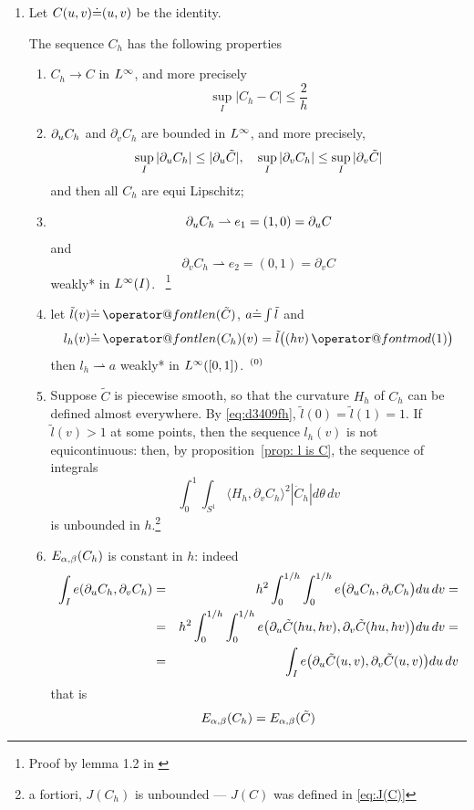 \documentclass[twoside,a4paper,english]{article}
\makeatletter
\def\derpar#1{\partial_{#1}}
\def\wto{\rightharpoonup}
\def\len{\mathop{\operator@font len}\nolimits}
\def\mod{\mathop{\operator@font mod}\nolimits}
\renewcommand{\thefootnote}{\,(\arabic{footnote})}
\makeatother
\begin{document}
\begin{enumerate}
\item 
 Let $C(u,v){\stackrel{\mbox{.}}{=}} (u,v)$ be the identity.

 The sequence $C_h$ has the following properties
 \begin{enumerate}
 \item $C_h\to C$ in $L^\infty$, and more precisely
   \[ \sup_{I} |C_h-C| \le \frac 2 h \]

 \item $\derpar \t C_h$ and $\derpar v C_h $
   are bounded in $L^\infty$, and more precisely,
   \[ \sup_I |\derpar \t C_h| \le  |\derpar \t \tilde C|,~~~
   \sup_I |\derpar v C_h|\le  \sup_I |\derpar v \tilde C| \] 
   and then all $C_h$ are equi Lipschitz;


 \item \[ \derpar \t C_h \wto e_1=(1,0)=\derpar \t C \] 
   and \[ \derpar v C_h \wto e_2=(0,1)=\derpar v  C \]
   weakly* in $L^\infty(I)$.~%
\footnote{Proof by lemma 1.2 in \cite{dacorogna:weak}}
   
 \item let $\tilde l(v)\defeq \len(\tilde C)$, $ a{\stackrel{\mbox{.}}{=}} \int \tilde l$ and
   \[ l_h(v) \defeq \len(C_h)(v) = \tilde l\big( (hv)\mod(1)\big)\]
   then $l_h\wto a$   weakly* in $L^\infty([0,1])$.$~^{\thefootnote}$

 \item\label{item: J esplode}
   Suppose $\tilde C$ is piecewise smooth, so that the curvature
   $H_h$ of $C_h$ can be defined almost everywhere.
   By \eqref{eq:d3409fh}, $\tilde l(0)=\tilde l(1)=1$.
   If $\tilde l(v)>1$ at some points, then the sequence
   $l_h(v)$ is not equicontinuous: then, by 
   proposition~\ref{prop: l is C}, the sequence of integrals
   \[ \int_{0}^{1}\int_{S^1}  \langle H_h, \derpar v C_h\rangle^2
   |\dot C_h|d\theta\,dv \]
   is unbounded in $h$.\footnote{a fortiori,
     $J(C_h)$ is unbounded --- $J(C)$ was defined in \eqref{eq:J(C)}}
 \item
   $E_{\alpha,\beta}(C_h)$ is constant in $h$:
   indeed
   \begin{eqnarray*}
     \int_I e(\derpar\t C_h,\derpar v C_h)&=&
     h^2 \int_0^{1/h}\int_0^{1/h} 
     e\big(\derpar\t C_h,\derpar v C_h\big) d\t\,dv=\\
     &=& h^2\int_0^{1/h}\int_0^{1/h} 
     e\big(\derpar\t \tilde C(h\t,hv),\derpar v\tilde C(h\t,hv)\big) d\t\,dv=\\
     &=&\int_I e\big(\derpar\t \tilde C(\t,v),\derpar v \tilde
     C(\t,v)\big)   d\t\,dv
   \end{eqnarray*}
   that is 
   \begin{equation}
     \label{eq: E a b const}
     E_{\alpha,\beta}(C_h)= E_{\alpha,\beta}(\tilde C)
   \end{equation}
\end{enumerate}


\end{enumerate}
\end{document}
